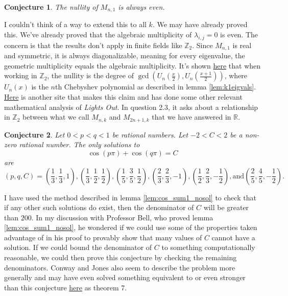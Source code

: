 \documentclass[12pt]{article}
\newtheorem{conjecture}{Conjecture}
\newcommand{\Z}{\mathbb{Z}}
\newcommand{\R}{\mathbb{R}}
\begin{document}
	\begin{conjecture}\label{conj:k1evennullity}
		The nullity of $M_{n,1}$ is always even.
	\end{conjecture}
	I couldn't think of a way to extend this to all $k$.
	We may have already proved this.
	We've already proved that the algebraic multiplicity of $\lambda_{i,j} = 0$ is
	even.
	The concern is that the results don't apply in finite fields like $\Z_2$.
	Since $M_{n,1}$ is real and symmetric, it is always diagonalizable, meaning for
	every eigenvalue, the geometric multiplicity equals the algebraic multiplicity.
	It's shown
	\href{https://www.sciencedirect.com/science/article/pii/S0304397504001823}{here}
	that when working in $\Z_2$, the nullity is the degree of
	$\gcd\left(U_n(\frac{x}{2}), U_n(\frac{x+1}{2})\right)$, where $U_n(x)$ is the
	$n$th Chebyshev polynomial as described in lemma \ref{lem:k1eigvals}.
	\href{https://peterefrancis.com/lights-out-algebra/}{Here} is another site that
	makes this claim and  has done some other relevant mathematical analysis of
	\textit{Lights Out}.
	In question 2.3, it asks about a relationship in $\Z_2$ between what we call
	$M_{n,k}$ and $M_{2n+1,k}$ that we have answered in $\R$.
	
	\begin{conjecture}\label{conj:cos_rationals}
		Let $ 0 < p < q < 1$ be rational numbers.
		Let $-2 < C < 2$ be a non-zero rational number.
		The only solutions to
		\begin{equation*}
		\cos{\left(p\pi\right)} + \cos{\left(q\pi\right)} = C
		\end{equation*}
		are 
		\begin{equation*}
		\left(p,q,C \right) = 
		\left(\frac{1}{3}, \frac{1}{3}, 1 \right), 
		\left(\frac{1}{3}, \frac{1}{2}, \frac{1}{2} \right), 
		\left(\frac{1}{5}, \frac{3}{5}, \frac{1}{2} \right), 
		\left(\frac{2}{3}, \frac{2}{3}, -1 \right), 
		\left(\frac{1}{2}, \frac{2}{3}, -\frac{1}{2} \right), \text{and} 
		\left(\frac{2}{5}, \frac{4}{5}, -\frac{1}{2} \right).
		\end{equation*}
	\end{conjecture}
	I have used the method described in lemma \ref{lem:cos_sum1_nosol} to check
	that if any other such solutions do exist, then the denominator of $C$ will be
	greater than $200$.
	In my discussion with Professor Bell, who proved lemma
	\ref{lem:cos_sum1_nosol}, he wondered if we could use some of the properties
	taken advantage of in his proof to provably show that many values of $C$ cannot
	have a solution.
	If we could bound the denominator of $C$ to something computationally
	reasonable, we could then prove this conjecture by checking the remaining
	denominators.
	Conway and Jones also seem to describe the problem more generally and may have
	even solved something equivalent to or even stronger than this conjecture
	\href{http://matwbn.icm.edu.pl/ksiazki/aa/aa30/aa3033.pdf}{here} as theorem 7.	
\end{document}
